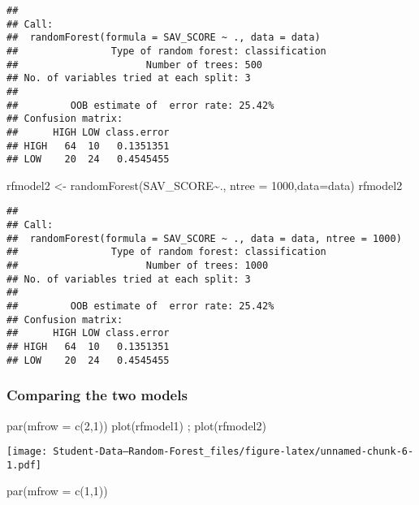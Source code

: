 \documentclass[
]{article}
\newenvironment{Shaded}{\begin{snugshade}}{\end{snugshade}}
\newcommand{\AttributeTok}[1]{\textcolor[rgb]{0.77,0.63,0.00}{#1}}
\newcommand{\DecValTok}[1]{\textcolor[rgb]{0.00,0.00,0.81}{#1}}
\newcommand{\FunctionTok}[1]{\textcolor[rgb]{0.00,0.00,0.00}{#1}}
\newcommand{\NormalTok}[1]{#1}
\newcommand{\OtherTok}[1]{\textcolor[rgb]{0.56,0.35,0.01}{#1}}
\newcommand{\SpecialCharTok}[1]{\textcolor[rgb]{0.00,0.00,0.00}{#1}}
\begin{document}
\begin{verbatim}
## 
## Call:
##  randomForest(formula = SAV_SCORE ~ ., data = data) 
##                Type of random forest: classification
##                      Number of trees: 500
## No. of variables tried at each split: 3
## 
##         OOB estimate of  error rate: 25.42%
## Confusion matrix:
##      HIGH LOW class.error
## HIGH   64  10   0.1351351
## LOW    20  24   0.4545455
\end{verbatim}

\begin{Shaded}
\begin{Highlighting}[]
\NormalTok{rfmodel2 }\OtherTok{\textless{}{-}} \FunctionTok{randomForest}\NormalTok{(SAV\_SCORE}\SpecialCharTok{\textasciitilde{}}\NormalTok{., }\AttributeTok{ntree =} \DecValTok{1000}\NormalTok{,}\AttributeTok{data=}\NormalTok{data)}
\NormalTok{rfmodel2 }
\end{Highlighting}
\end{Shaded}

\begin{verbatim}
## 
## Call:
##  randomForest(formula = SAV_SCORE ~ ., data = data, ntree = 1000) 
##                Type of random forest: classification
##                      Number of trees: 1000
## No. of variables tried at each split: 3
## 
##         OOB estimate of  error rate: 25.42%
## Confusion matrix:
##      HIGH LOW class.error
## HIGH   64  10   0.1351351
## LOW    20  24   0.4545455
\end{verbatim}

\hypertarget{comparing-the-two-models}{%
\subsubsection{Comparing the two
models}\label{comparing-the-two-models}}

\begin{Shaded}
\begin{Highlighting}[]
\FunctionTok{par}\NormalTok{(}\AttributeTok{mfrow =} \FunctionTok{c}\NormalTok{(}\DecValTok{2}\NormalTok{,}\DecValTok{1}\NormalTok{))}
\FunctionTok{plot}\NormalTok{(rfmodel1) ; }\FunctionTok{plot}\NormalTok{(rfmodel2)}
\end{Highlighting}
\end{Shaded}

\texttt{[image: Student-Data---Random-Forest\_files/figure-latex/unnamed-chunk-6-1.pdf]}

\begin{Shaded}
\begin{Highlighting}[]
\FunctionTok{par}\NormalTok{(}\AttributeTok{mfrow =} \FunctionTok{c}\NormalTok{(}\DecValTok{1}\NormalTok{,}\DecValTok{1}\NormalTok{))}
\end{Highlighting}
\end{Shaded}
\end{document}
